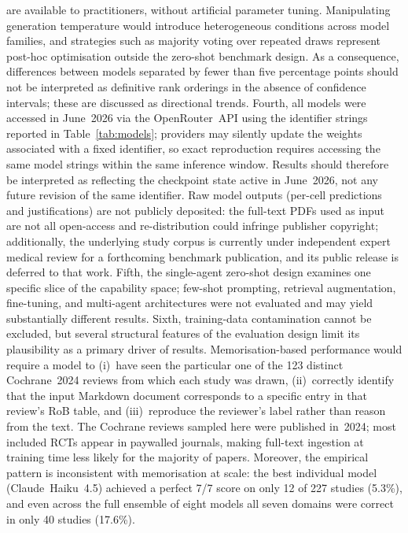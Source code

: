 \documentclass[../main.tex]{subfiles}
\begin{document}
are available to practitioners, without artificial parameter tuning.
Manipulating generation temperature would introduce heterogeneous conditions
across model families, and strategies such as majority voting over repeated
draws represent post-hoc optimisation outside the zero-shot benchmark design.
As a consequence, differences between models separated by fewer than five
percentage points should not be interpreted as definitive rank orderings in the
absence of confidence intervals; these are discussed as directional trends.
Fourth, all models were accessed in June~2026 via the OpenRouter~API using the
identifier strings reported in Table~\ref{tab:models}; providers may silently
update the weights associated with a fixed identifier, so exact reproduction
requires accessing the same model strings within the same inference window.
Results should therefore be interpreted as reflecting the checkpoint state active
in June~2026, not any future revision of the same identifier.
Raw model outputs (per-cell predictions and justifications) are not publicly
deposited: the full-text PDFs used as input are not all open-access and
re-distribution could infringe publisher copyright; additionally, the underlying
study corpus is currently under independent expert medical review for a
forthcoming benchmark publication, and its public release is deferred to
that work.
Fifth, the single-agent zero-shot design examines one specific slice of the
capability space; few-shot prompting, retrieval augmentation, fine-tuning, and
multi-agent architectures were not evaluated and may yield substantially
different results.
Sixth, training-data contamination cannot be excluded, but several structural
features of the evaluation design limit its plausibility as a primary driver
of results.
Memorisation-based performance would require a model to (i)~have seen the
particular one of the 123 distinct Cochrane~2024 reviews from which each study
was drawn, (ii)~correctly identify that the input Markdown document corresponds
to a specific entry in that review's RoB table, and
(iii)~reproduce the reviewer's label rather than reason from the text.
The Cochrane reviews sampled here were published in~2024; most included RCTs
appear in paywalled journals, making full-text ingestion at training time less
likely for the majority of papers.
Moreover, the empirical pattern is inconsistent with memorisation at scale:
the best individual model (Claude~Haiku~4.5) achieved a perfect 7/7 score on
only 12 of 227 studies (5.3\%), and even across the full ensemble of eight
models all seven domains were correct in only 40 studies (17.6\%).
\end{document}
